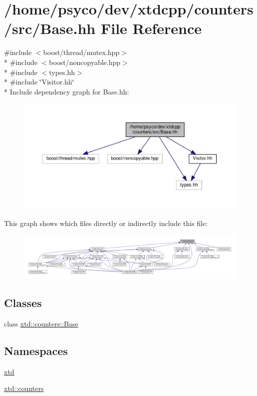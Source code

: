 \hypertarget{Base_8hh}{}\section{/home/psyco/dev/xtdcpp/counters/src/\+Base.hh File Reference}
\label{Base_8hh}
{\ttfamily \#include $<$boost/thread/mutex.\+hpp$>$}\\*
{\ttfamily \#include $<$boost/noncopyable.\+hpp$>$}\\*
{\ttfamily \#include $<$types.\+hh$>$}\\*
{\ttfamily \#include \char`\"{}Visitor.\+hh\char`\"{}}\\*
Include dependency graph for Base.\+hh\+:
\nopagebreak
\begin{figure}[H]
\begin{center}
\leavevmode
\includegraphics[width=350pt]{Base_8hh__incl}
\end{center}
\end{figure}
This graph shows which files directly or indirectly include this file\+:
\nopagebreak
\begin{figure}[H]
\begin{center}
\leavevmode
\includegraphics[width=350pt]{Base_8hh__dep__incl}
\end{center}
\end{figure}
\subsection*{Classes}
\begin{DoxyCompactItemize}
\item 
class \hyperlink{classxtd_1_1counters_1_1Base}{xtd\+::counters\+::\+Base}
\end{DoxyCompactItemize}
\subsection*{Namespaces}
\begin{DoxyCompactItemize}
\item 
 \hyperlink{namespacextd}{xtd}
\item 
 \hyperlink{namespacextd_1_1counters}{xtd\+::counters}
\end{DoxyCompactItemize}
